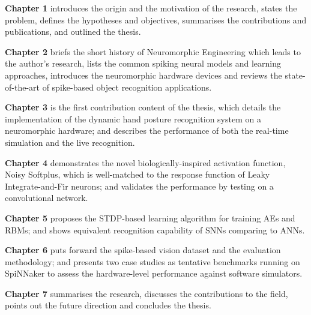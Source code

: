 \textbf{Chapter 1} introduces the origin and the motivation of the research, states the problem, defines the hypotheses and objectives, summarises the contributions and publications, and outlined the thesis. 

\textbf{Chapter 2} briefs the short history of Neuromorphic Engineering which leads to the author's research, lists the common spiking neural models and learning approaches, introduces the neuromorphic hardware devices and reviews the state-of-the-art of spike-based object recognition applications. 

\textbf{Chapter 3} is the first contribution content of the thesis, which details the implementation of the dynamic hand posture recognition system on a neuromorphic hardware; and describes the performance of both the real-time simulation and the live recognition. 

\textbf{Chapter 4} demonstrates the novel biologically-inspired activation function, Noisy Softplus, which is well-matched to the response function of Leaky Integrate-and-Fir neurons; and validates the performance by testing on a convolutional network.

\textbf{Chapter 5} proposes the STDP-based learning algorithm for training AEs and RBMs; and shows equivalent recognition capability of SNNs comparing to ANNs.

\textbf{Chapter 6} puts forward the spike-based vision dataset and the evaluation methodology; and presents two case studies as tentative benchmarks running on SpiNNaker to assess the hardware-level performance against software simulators.

\textbf{Chapter 7} summarises the research, discusses the contributions to the field, points out the future direction and concludes the thesis.



